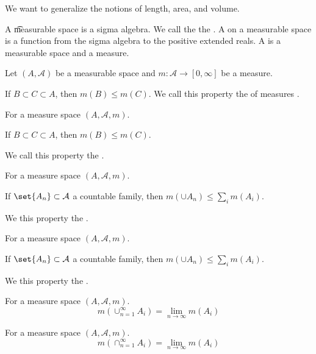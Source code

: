 
We want to generalize the notions of length, area, and volume.


A \t{measurable space}
is a sigma algebra.
We call the
the .
A
on a measurable space
is a function from the sigma algebra
to the positive extended reals.
A
is a measurable space and a measure.



\begin{prop}
Let $(A, \mathcal{A} )$ be a measurable space and
$m: \mathcal{A}  \to [0, \infty]$ be a measure.

If $B \subset C \subset A$, then $m(B) \leq m(C)$.
We call this property the of measures
.
\end{prop}

\begin{prop}
For a measure space $(A, \mathcal{A} , m)$.

If $B \subset C \subset A$, then $m(B) \leq m(C)$.

We call this property the
.
\end{prop}

\begin{prop}
For a measure space $(A, \mathcal{A} , m)$.

If $\set{A_n} \subset \mathcal{A} $ a countable family,
then $m(\cup A_n) \leq \sum_{i} m(A_i)$.

We this property the
.
\end{prop}

\begin{prop}
For a measure space $(A, \mathcal{A} , m)$.

If $\set{A_n} \subset \mathcal{A} $ a countable family,
then $m(\cup A_n) \leq \sum_{i} m(A_i)$.

We this property the
.
\end{prop}

\begin{prop}
For a measure space $(A, \mathcal{A} , m)$.
\[
m(\cup_{n = 1}^{\infty} A_i) = \lim_{n \to \infty} m(A_i)
\]
\end{prop}

\begin{prop}
For a measure space $(A, \mathcal{A} , m)$.
\[
m(\cap _{n = 1}^{\infty} A_i) = \lim_{n \to \infty} m(A_i)
\]
\end{prop}


